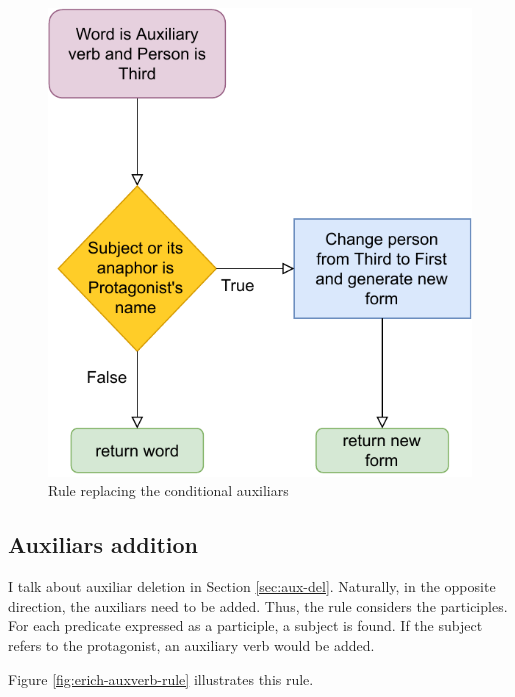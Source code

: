 \begin{figure}[!htbp]
\includegraphics[]{data/Erich-Conditional-Rule.pdf}
\caption{Rule replacing the conditional auxiliars}
\label{fig:erich-conditional-rule}
\end{figure}

\subsection{Auxiliars addition}

I talk about auxiliar deletion in Section \ref{sec:aux-del}. Naturally, in the opposite direction, the auxiliars need to be added. Thus, the rule considers the participles. For each predicate expressed as a participle, a subject is found. If the subject refers to the protagonist, an auxiliary verb would be added.

Figure \ref{fig:erich-auxverb-rule} illustrates this rule.


